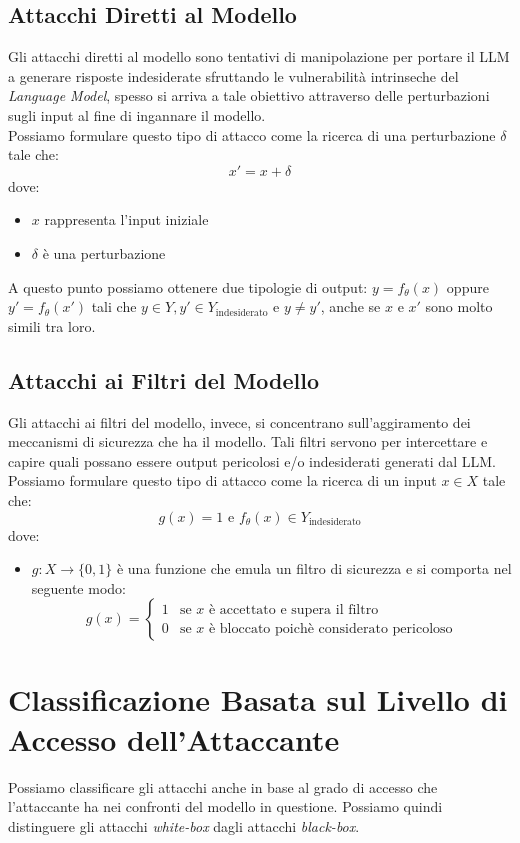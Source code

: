 \subsection{Attacchi Diretti al Modello}
Gli attacchi diretti al modello sono tentativi di manipolazione per portare il LLM a generare risposte indesiderate sfruttando le vulnerabilit\`a intrinseche del \emph{Language Model}, spesso si arriva a tale obiettivo attraverso delle perturbazioni sugli input al fine di ingannare il modello.\\
Possiamo formulare questo tipo di attacco come la ricerca di una perturbazione \(\delta\) tale che:
\[x'=x+\delta\]
dove:
\begin{itemize}
    \item \(x\) rappresenta l'input iniziale
    \item \(\delta\) \`e una perturbazione
\end{itemize}
A questo punto possiamo ottenere due tipologie di output: \(y = f_\theta(x)\) oppure \(y' = f_\theta(x')\) tali che \(y \in Y, y' \in Y_\text{indesiderato}\) e \(y \neq y'\), anche se \(x\) e \(x'\) sono molto simili tra loro.

\subsection{Attacchi ai Filtri del Modello}
Gli attacchi ai filtri del modello, invece, si concentrano sull'aggiramento dei meccanismi di sicurezza che ha il modello. Tali filtri servono per intercettare e capire quali possano essere output pericolosi e/o indesiderati generati dal LLM.\\
Possiamo formulare questo tipo di attacco come la ricerca di un input \(x \in X\) tale che:
\[g(x)=1 \text{ e } f_\theta(x)\in Y_\text{indesiderato}\]
dove:
\begin{itemize}
    \item \(g:X\rightarrow \{0,1\}\) \`e una funzione che emula un filtro di sicurezza e si comporta nel seguente modo:
     \begin{equation*}
        g(x) = \begin{cases}
        1 &\text{se \(x\) \`e accettato e supera il filtro}\\
        0 &\text{se \(x\) \`e bloccato poich\`e considerato pericoloso}
        \end{cases}
    \end{equation*}
\end{itemize}


\section{Classificazione Basata sul Livello di Accesso dell'Attaccante}
Possiamo classificare gli attacchi anche in base al grado di accesso che l'attaccante ha nei confronti del modello in questione. 
Possiamo quindi distinguere gli attacchi \emph{white-box} dagli attacchi \emph{black-box}.

